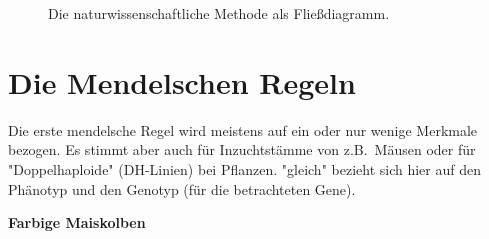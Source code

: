 


\begin{figure}[H]
    \caption{Die naturwissenschaftliche Methode als Fließdiagramm.}
\end{figure}


\section{Die Mendelschen Regeln}


Die erste mendelsche Regel wird meistens auf ein oder nur wenige Merkmale bezogen.
Es stimmt aber auch für Inzuchtstämme von z.B.\ Mäusen oder für "Doppelhaploide" (DH-Linien) bei Pflanzen.
"gleich" bezieht sich hier auf den Phänotyp und den Genotyp (für die betrachteten Gene).

\begin{bsp}
    \textbf{Farbige Maiskolben} \\
\end{bsp}

